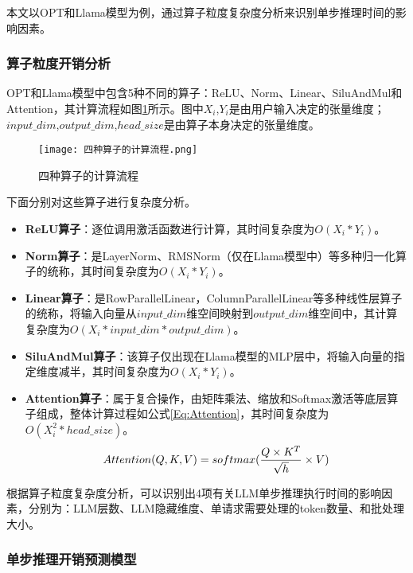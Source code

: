 本文以OPT和Llama模型为例，通过算子粒度复杂度分析来识别单步推理时间的影响因素。

\subsubsection{算子粒度开销分析}

OPT和Llama模型中包含5种不同的算子：ReLU、Norm、Linear、SiluAndMul和Attention，其计算流程如图\ref{Fig:四种算子的计算流程}所示。图中$X_i$,$Y_i$是由用户输入决定的张量维度；$input\_dim$,$output\_dim$,$head\_size$是由算子本身决定的张量维度。 

\begin{figure}[!htbp]
  \centering
  \texttt{[image: 四种算子的计算流程.png]}
  \caption{四种算子的计算流程}
  \label{Fig:四种算子的计算流程}
\end{figure}

下面分别对这些算子进行复杂度分析。

\begin{itemize}
  \item \textbf{ReLU算子}：逐位调用激活函数进行计算，其时间复杂度为$O(X_i*Y_i)$。
  \item \textbf{Norm算子}：是LayerNorm、RMSNorm（仅在Llama模型中）等多种归一化算子的统称，其时间复杂度为$O(X_i*Y_i)$。
  \item \textbf{Linear算子}：是RowParallelLinear，ColumnParallelLinear等多种线性层算子的统称，将输入向量从$input\_dim$维空间映射到$output\_dim$维空间中，其计算复杂度为$O(X_i*input\_dim*output\_dim)$。
  \item \textbf{SiluAndMul算子}：该算子仅出现在Llama模型的MLP层中，将输入向量的指定维度减半，其时间复杂度为$O(X_i*Y_i)$。
  \item \textbf{Attention算子}：属于复合操作，由矩阵乘法、缩放和Softmax激活等底层算子组成，整体计算过程如公式\ref{Eq:Attention}，其时间复杂度为$O(X_i^2*head\_size)$。
  \begin{equation}
    \small
    Attention(Q,K,V)=softmax(\frac{Q\times K^T}{\sqrt{h}}\times V)
    \label{Eq:Attention}
  \end{equation}
\end{itemize}

根据算子粒度复杂度分析，可以识别出4项有关LLM单步推理执行时间的影响因素，分别为：LLM层数、LLM隐藏维度、单请求需要处理的token数量、和批处理大小。


\subsubsection{单步推理开销预测模型}

